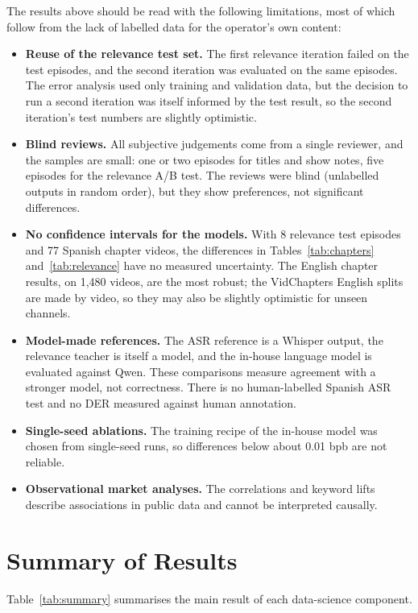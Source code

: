 The results above should be read with the following limitations, most of which follow from the lack of labelled data for the operator's own content:
\begin{itemize}
\item \textbf{Reuse of the relevance test set.} The first relevance iteration failed on the test episodes, and the second iteration was evaluated on the same episodes. The error analysis used only training and validation data, but the decision to run a second iteration was itself informed by the test result, so the second iteration's test numbers are slightly optimistic.
\item \textbf{Blind reviews.} All subjective judgements come from a single reviewer, and the samples are small: one or two episodes for titles and show notes, five episodes for the relevance A/B test. The reviews were blind (unlabelled outputs in random order), but they show preferences, not significant differences.
\item \textbf{No confidence intervals for the models.} With 8 relevance test episodes and 77 Spanish chapter videos, the differences in Tables~\ref{tab:chapters} and~\ref{tab:relevance} have no measured uncertainty. The English chapter results, on 1{,}480 videos, are the most robust; the VidChapters English splits are made by video, so they may also be slightly optimistic for unseen channels.
\item \textbf{Model-made references.} The ASR reference is a Whisper output, the relevance teacher is itself a model, and the in-house language model is evaluated against Qwen. These comparisons measure agreement with a stronger model, not correctness. There is no human-labelled Spanish ASR test and no DER measured against human annotation.
\item \textbf{Single-seed ablations.} The training recipe of the in-house model was chosen from single-seed runs, so differences below about 0.01 bpb are not reliable.
\item \textbf{Observational market analyses.} The correlations and keyword lifts describe associations in public data and cannot be interpreted causally.
\end{itemize}

\section{Summary of Results}

Table~\ref{tab:summary} summarises the main result of each data-science component.

